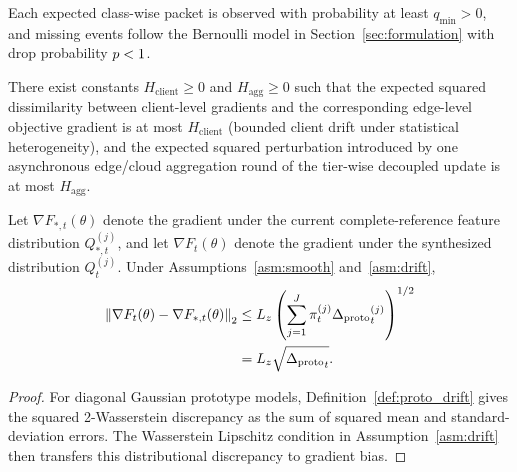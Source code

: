 \begin{assumption}\label{asm:participation}
Each expected class-wise packet is observed with probability at least $q_{\min}>0$, and missing events follow the Bernoulli model in Section~\ref{sec:formulation} with drop probability $p<1$.
\end{assumption}

\begin{assumption}\label{asm:het_agg}
There exist constants $H_{\mathrm{client}}\geq0$ and $H_{\mathrm{agg}}\geq0$ such that the expected squared dissimilarity between client-level gradients and the corresponding edge-level objective gradient is at most $H_{\mathrm{client}}$ (bounded client drift under statistical heterogeneity), and the expected squared perturbation introduced by one asynchronous edge/cloud aggregation round of the tier-wise decoupled update is at most $H_{\mathrm{agg}}$.
\end{assumption}

\begin{lemma}\label{lem:synthesis_bias}
Let $\nabla F_{*,t}(\theta)$ denote the gradient under the current complete-reference feature distribution $Q_{*,t}^{(j)}$, and let $\nabla F_t(\theta)$ denote the gradient under the synthesized distribution $Q_t^{(j)}$. Under Assumptions~\ref{asm:smooth} and~\ref{asm:drift},
\begin{equation}
    \begin{split}
    \left\|
    \nabla F_t(\theta)-\nabla F_{*,t}(\theta)
    \right\|_2
    &\leq
    L_z
    \left(\sum_{j=1}^{J}\pi_t^{(j)}{\Delta_{\mathrm{proto}}}_t^{(j)}\right)^{1/2}
    \\
    &=
    L_z\sqrt{{\Delta_{\mathrm{proto}}}_t}.
    \end{split}
\end{equation}
\end{lemma}
\begin{proof}
For diagonal Gaussian prototype models, Definition~\ref{def:proto_drift} gives the squared 2-Wasserstein discrepancy as the sum of squared mean and standard-deviation errors. The Wasserstein Lipschitz condition in Assumption~\ref{asm:drift} then transfers this distributional discrepancy to gradient bias.
\end{proof}

